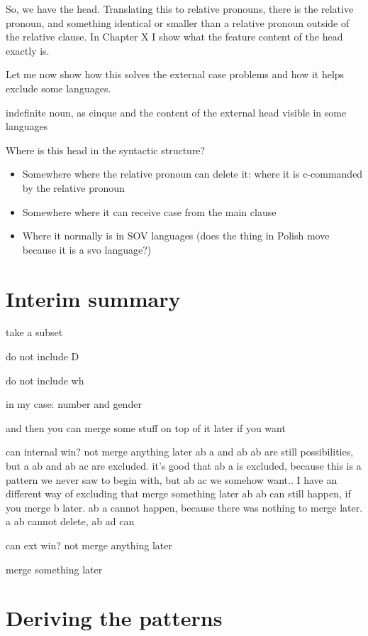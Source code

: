 So, we have the head. Translating this to relative pronouns, there is the relative pronoun, and something identical or smaller than a relative pronoun outside of the relative clause. In Chapter X I show what the feature content of the head exactly is.

Let me now show how this solves the external case problems and how it helps exclude some languages.

indefinite noun, as cinque and the content of the external head visible in some languages

Where is this head in the syntactic structure?

  \begin{itemize}
    \item Somewhere where the relative pronoun can delete it: where it is c-commanded by the relative pronoun
    \item Somewhere where it can receive case from the main clause
    \item Where it normally is in SOV languages (does the thing in Polish move because it is a svo language?)
  \end{itemize}

\section{Interim summary}\label{sec:interim-summary-proposal}

take a subset

do not include D

do not include wh

in my case: number and gender

and then you can merge some stuff on top of it later if you want

can internal win?
  not merge anything later
    ab a and ab ab are still possibilities, but a ab and ab ac are excluded. it's good that ab a is excluded, because this is a pattern we never saw to begin with, but ab ac we somehow want.. I have an different way of excluding that
  merge something later
    ab ab can still happen, if you merge b later. ab a cannot happen, because there was nothing to merge later. a ab cannot delete, ab ad can

can ext win?
  not merge anything later

  merge something later





\section{Deriving the patterns}\label{sec:deriving-languages}

